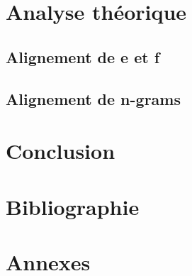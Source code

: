 \documentclass[a4paper,10pt]{article}
\begin{document}
\section{Analyse théorique}

\subsection{Alignement de e et f}

\subsection{Alignement de n-grams}


\section{Conclusion}


\section{Bibliographie}




\section{Annexes}
\end{document}
